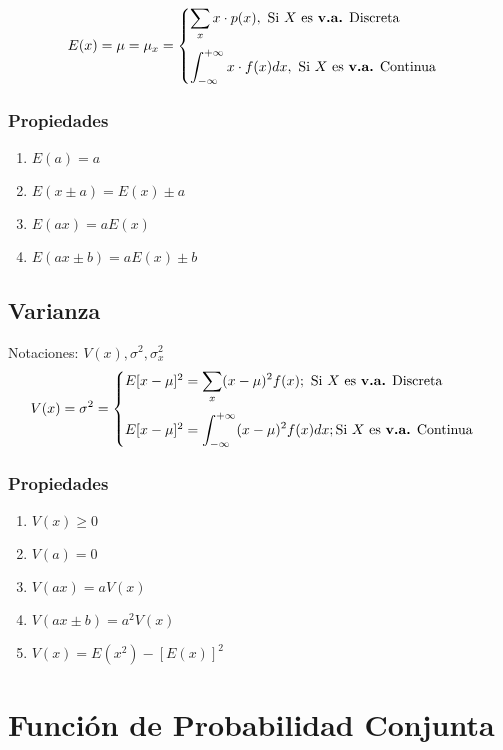 $$
E(x)=\mu =\mu_x =
\begin{cases}
\displaystyle\sum_{x} x\cdot p(x), \text{ Si $X$ es \textbf{v.a.} Discreta}\vspace{0.25cm}\\
\displaystyle\int_{-\infty}^{+\infty} x\cdot f(x) dx, \text{ Si $X$ es \textbf{v.a.} Continua}
\end{cases}
$$
\subsubsection{Propiedades}
\begin{enumerate}
\item $E(a)=a$
\item $E(x\pm a)=E(x)\pm a$
\item $E(ax)=aE(x)$
\item $E(ax\pm b)=aE(x)\pm b$
\end{enumerate}
\subsection{Varianza}
Notaciones: $V(x),\sigma^2,\sigma_{x}^{2}$
$$
V(x)=\sigma^2 =
\begin{cases}
E[x-\mu]^2 = \displaystyle\sum_{x} (x-\mu)^2 f(x); \text{ Si $X$ es \textbf{v.a.} Discreta}\vspace{0.25cm}\\
E[x-\mu]^2 = \displaystyle\int_{-\infty}^{+\infty} (x-\mu)^2 f(x)dx; \text{Si $X$ es \textbf{v.a.} Continua}
\end{cases}
$$
\subsubsection{Propiedades}
\begin{enumerate}
\item $V(x)\geq 0$
\item $V(a)=0$
\item $V(ax)=aV(x)$
\item $V(ax\pm b)=a^2 V(x)$
\item $V(x)=E(x^2)-[E(x)]^2$
\end{enumerate}
\begin{multicols}{2}
\begin{flushleft}
\end{flushleft}
\columnbreak
\end{multicols}
\section{Función de Probabilidad Conjunta}

